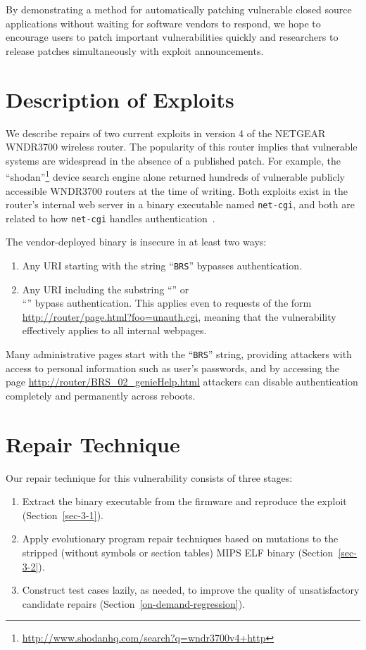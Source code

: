 \documentclass{sigcomm-alternate}
\begin{document}
By demonstrating a method for automatically patching vulnerable closed source
applications without waiting for software vendors to respond, we hope to encourage
users to patch important vulnerabilities quickly and researchers to
release patches simultaneously
with exploit announcements.

\section{Description of Exploits}
\label{sec-2}
We describe repairs of two current exploits in version 4 of the NETGEAR WNDR3700
wireless router. The popularity of this router implies that vulnerable
systems are widespread in the absence of a published patch. For example, the
``shodan''\footnote{\url{http://www.shodanhq.com/search?q=wndr3700v4+http}}
device search engine alone returned hundreds of vulnerable publicly
accessible WNDR3700 routers at the time of writing.
Both exploits exist in the router's internal web server in a binary
executable named \texttt{net-cgi}, and both are related to how
\texttt{net-cgi} handles authentication~\cite{zcutlip}.

The vendor-deployed binary is insecure in at least two ways: 
\begin{enumerate}
\item Any URI starting with the string ``{\tt BRS}'' bypasses authentication.

\item Any URI including the substring ``'' or\\
  ``'' bypass authentication. This applies
  even to requests of the form
  \url{http://router/page.html?foo=unauth.cgi}, meaning that the
  vulnerability effectively applies to all internal webpages.
\end{enumerate}

Many administrative pages start with the ``{\tt BRS}'' string, providing
attackers with access to personal information such as user's
passwords, and by accessing the page
\url{http://router/BRS_02_genieHelp.html} attackers can
disable authentication completely and permanently
across reboots.

\section{Repair Technique}
\label{sec-3}

Our repair technique for this vulnerability consists of three stages:
\begin{enumerate}
\item Extract the binary executable from the firmware and reproduce
the exploit (Section~\ref{sec-3-1}).
\item Apply evolutionary program repair techniques based on mutations
  to the stripped (without symbols or section tables) MIPS ELF binary
  (Section~\ref{sec-3-2}).
\item Construct test cases lazily, as needed, to improve the quality of
unsatisfactory candidate repairs (Section~\ref{on-demand-regression}). 
\end{enumerate} 
\end{document}
